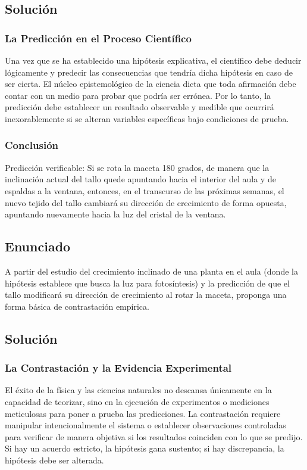 \documentclass[12pt, a4paper]{article}
\begin{document}
\subsection*{Solución}

\subsubsection*{La Predicción en el Proceso Científico}
Una vez que se ha establecido una hipótesis explicativa, el científico debe deducir lógicamente y predecir las consecuencias que tendría dicha hipótesis en caso de ser cierta. El núcleo epistemológico de la ciencia dicta que toda afirmación debe contar con un medio para probar que podría ser errónea. Por lo tanto, la predicción debe establecer un resultado observable y medible que ocurrirá inexorablemente si se alteran variables específicas bajo condiciones de prueba.

\subsubsection*{Conclusión}
Predicción verificable: Si se rota la maceta 180 grados, de manera que la inclinación actual del tallo quede apuntando hacia el interior del aula y de espaldas a la ventana, entonces, en el transcurso de las próximas semanas, el nuevo tejido del tallo cambiará su dirección de crecimiento de forma opuesta, apuntando nuevamente hacia la luz del cristal de la ventana.

\newpage

\subsection*{Enunciado}
A partir del estudio del crecimiento inclinado de una planta en el aula (donde la hipótesis establece que busca la luz para fotosíntesis) y la predicción de que el tallo modificará su dirección de crecimiento al rotar la maceta, proponga una forma básica de contrastación empírica.

\subsection*{Solución}

\subsubsection*{La Contrastación y la Evidencia Experimental}
El éxito de la física y las ciencias naturales no descansa únicamente en la capacidad de teorizar, sino en la ejecución de experimentos o mediciones meticulosas para poner a prueba las predicciones. La contrastación requiere manipular intencionalmente el sistema o establecer observaciones controladas para verificar de manera objetiva si los resultados coinciden con lo que se predijo. Si hay un acuerdo estricto, la hipótesis gana sustento; si hay discrepancia, la hipótesis debe ser alterada.
\end{document}
